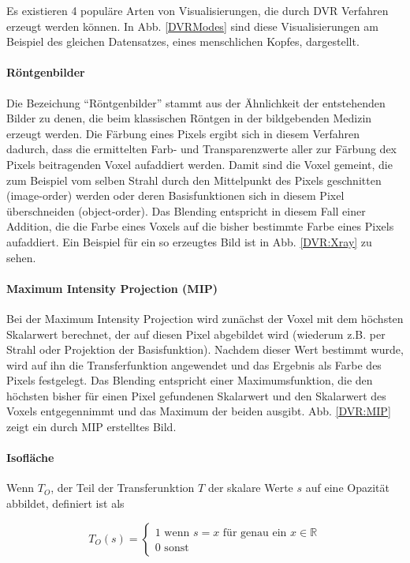 \documentclass[a4paper,fontsize=12pt,toc=bib,halfparskip]{scrartcl}
\begin{document}
Es existieren 4 popul\"are Arten von Visualisierungen, die durch DVR Verfahren erzeugt werden k\"onnen. In Abb. \ref{DVRModes} sind diese Visualisierungen am Beispiel des gleichen Datensatzes, eines menschlichen Kopfes, dargestellt.

\paragraph{R\"ontgenbilder}
Die Bezeichung ``R\"ontgenbilder'' stammt aus der \"Ahnlichkeit der entstehenden Bilder zu denen, die beim klassischen R\"ontgen in der bildgebenden Medizin erzeugt werden. Die F\"arbung eines Pixels ergibt sich in diesem Verfahren dadurch, dass die ermittelten Farb- und Transparenzwerte aller zur F\"arbung dex Pixels beitragenden Voxel aufaddiert werden. Damit sind die Voxel gemeint, die zum Beispiel vom selben Strahl durch den Mittelpunkt des Pixels geschnitten (image-order) werden oder deren Basisfunktionen sich in diesem Pixel \"uberschneiden (object-order). Das Blending entspricht in diesem Fall einer Addition, die die Farbe eines Voxels auf die bisher bestimmte Farbe eines Pixels aufaddiert. Ein Beispiel f\"ur ein so erzeugtes Bild ist in Abb. \ref{DVR:Xray} zu sehen. 

\paragraph{Maximum Intensity Projection (MIP)}
Bei der Maximum Intensity Projection wird zun\"achst der Voxel mit dem h\"ochsten Skalarwert berechnet, der auf diesen Pixel abgebildet wird (wiederum z.B. per Strahl oder Projektion der Basisfunktion). Nachdem dieser Wert bestimmt wurde, wird auf ihn die Transferfunktion angewendet und das Ergebnis als Farbe des Pixels festgelegt. Das Blending entspricht einer Maximumsfunktion, die den h\"ochsten bisher f\"ur einen Pixel gefundenen Skalarwert und den Skalarwert des Voxels entgegennimmt und das Maximum der beiden ausgibt. Abb. \ref{DVR:MIP} zeigt ein durch MIP erstelltes Bild. 


\paragraph{Isofl\"ache}
Wenn $T_O$, der Teil der Transferunktion $T$ der skalare Werte $s$ auf eine Opazit\"at abbildet, definiert ist als

\begin{equation}
T_O(s) = 
\begin{cases}
1\text{ wenn $s=x$ f\"ur genau ein $x \in \mathbb{R}$}\\
0\text{ sonst}
\end{cases}
\end{equation}
\end{document}
